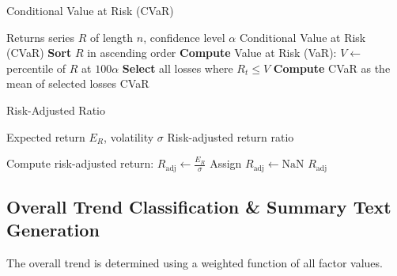 \documentclass[3p,times,procedia]{elsarticle}
\begin{document}
\begin{algorithm}
\caption{Conditional Value at Risk (CVaR)}
\label{alg:cvar}
\begin{algorithmic}[1]
    \Require Returns series $R$ of length $n$, confidence level $\alpha$
    \Ensure Conditional Value at Risk (CVaR)
    \State \textbf{Sort} $R$ in ascending order 
    \State \textbf{Compute} Value at Risk (VaR): $V \gets$ percentile of $R$ at $100\alpha$
    \State \textbf{Select} all losses where $R_t \leq V$
    \State \textbf{Compute} CVaR as the mean of selected losses
    \State \Return CVaR
\end{algorithmic}
\end{algorithm}
\newpage
{}
\begin{algorithm}
\caption{Risk-Adjusted Ratio}
\label{alg:integrated_risk}
\begin{algorithmic}[1]
    \Require Expected return $E_R$, volatility $\sigma$
    \Ensure Risk-adjusted return ratio
    
        \State Compute risk-adjusted return: $R_{\text{adj}} \gets \frac{E_R}{\sigma}$
    \Else
        \State Assign $R_{\text{adj}} \gets \text{NaN}$
    \EndIf
    \State \Return $R_{\text{adj}}$
\end{algorithmic}
\end{algorithm}

\subsection{Overall Trend Classification \& Summary Text Generation}
The overall trend is determined using a weighted function of all factor values.
\end{document}

